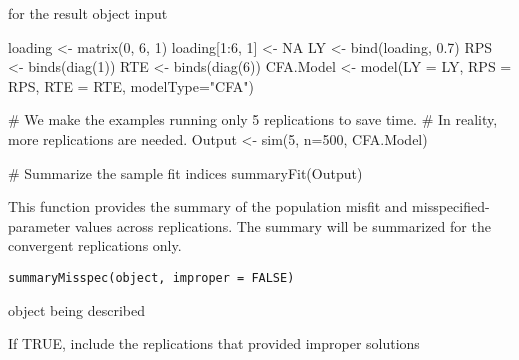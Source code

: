 \documentclass[a4paper]{book}
\begin{document}
%
\begin{SeeAlso}\relax
{} for the result object input
\end{SeeAlso}
%
\begin{Examples}
\begin{ExampleCode}
loading <- matrix(0, 6, 1)
loading[1:6, 1] <- NA
LY <- bind(loading, 0.7)
RPS <- binds(diag(1))
RTE <- binds(diag(6))
CFA.Model <- model(LY = LY, RPS = RPS, RTE = RTE, modelType="CFA")

# We make the examples running only 5 replications to save time.
# In reality, more replications are needed.
Output <- sim(5, n=500, CFA.Model)

# Summarize the sample fit indices
summaryFit(Output)
\end{ExampleCode}
\end{Examples}
%
\begin{Description}\relax
This function provides the summary of the population misfit and misspecified-parameter values across replications. The summary will be summarized for the convergent replications only.
\end{Description}
%
\begin{Usage}
\begin{verbatim}
summaryMisspec(object, improper = FALSE)
\end{verbatim}
\end{Usage}
%
\begin{Arguments}
\begin{ldescription}
\item[\code{object}] 
 object being described

\item[\code{improper}] 
If TRUE, include the replications that provided improper solutions

\end{ldescription}
\end{Arguments}
%
\end{document}
